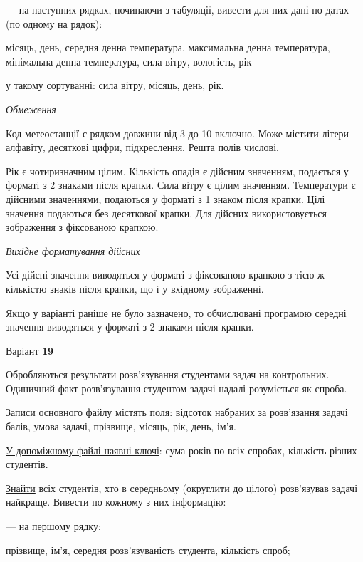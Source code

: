 \documentclass[11pt, ukrainian]{article}
\begin{document}
{\noindent}--- на наступних рядках, починаючи з табуляції, вивести для них дані по датах (по одному на рядок):\par
місяць, день, середня денна температура, максимальна денна температура, мінімальна денна температура, сила вітру, вологість, рік

{\noindent}у такому сортуванні: сила вітру, місяць, день, рік.


\bigskip\textit{Обмеження}

Код метеостанції є рядком довжини від 3 до 10 включно.
Може містити літери алфавіту, десяткові цифри, підкреслення. Решта полів числові.

Рік є чотиризначним цілим.
Кількість опадів є дійсним значенням, подається у форматі з 2 знаками після крапки.
Сила вітру є цілим значенням.
Температури є дійсними значеннями, подаються у форматі з 1 знаком після крапки.
Цілі значення подаються без десяткової крапки.
Для дійсних використовується зображення з фіксованою крапкою.

\textit{Вихідне форматування дійсних}

Усі дійсні значення виводяться у форматі з фіксованою крапкою з тією ж кількістю знаків після крапки, що і у вхідному зображенні.

Якщо у варіанті раніше не було зазначено, то \underline{обчислювані програмою} середні значення виводяться у форматі з 2 знаками після крапки.




\par
\newpage
{\center Варіант  \No \textbf { 19 }\par}
\bigskip
Обробляються результати розв’язування студентами задач на контрольних.
Одиничний факт роз\-в’я\-зу\-вання студентом задачі надалі розуміється як спроба.

\underline{Записи основного файлу містять поля}: відсоток набраних за розв’язання задачі балів, умова задачі, прізвище, місяць, рік, день, ім’я.

\underline{У допоміжному файлі наявні ключі}: сума років по всіх спробах, кількість різних студентів.

\underline{Знайти} всіх студентів, хто в середньому (округлити до цілого) розв’язував задачі найкраще. Вивести по кожному з них інформацію:\par
{\noindent}--- на першому рядку:\par
прізвище, ім’я, середня розв’язуваність студента, кількість спроб;
\end{document}
